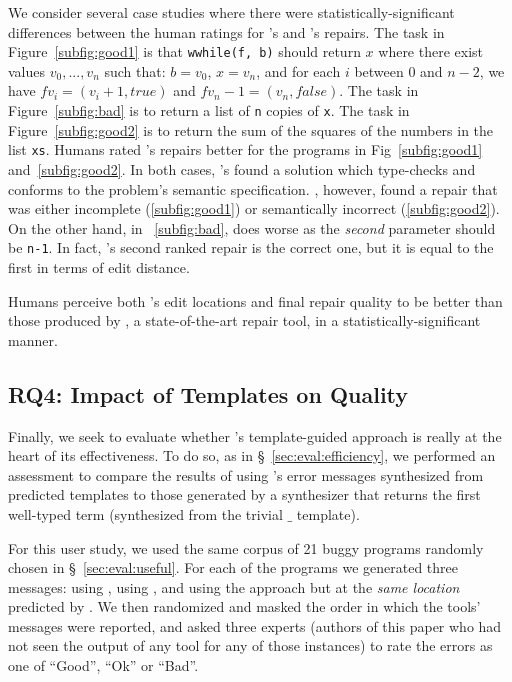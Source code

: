 %
We consider several case studies where there were
statistically-significant differences between
the human ratings for \toolname's and \seminal's
repairs.
%
The task in Figure~\ref{subfig:good1} is that
\texttt{wwhile(f, b)} should return $x$ where
there exist values $v_0,...,v_n$ such that:
$b = v_0$, $x = v_n$, and for each $i$ between
0 and $n-2$, we have $f v_i = (v_i+1, true)$
and $f v_n-1 = (v_n, false)$.
%
The task in Figure~\ref{subfig:bad} is to
return a list of \texttt{n} copies of \texttt{x}.
%
The task in Figure~\ref{subfig:good2} is to
return the sum of the squares of the numbers
in the list \texttt{xs}.
%
Humans rated \toolname's repairs better
for the programs in Fig~\ref{subfig:good1}
and~\ref{subfig:good2}.
%
In both cases, \toolname's found a solution
which type-checks and conforms to the problem's
semantic specification.
%
\seminal, however, found a repair that was
either incomplete (\ref{subfig:good1}) or
semantically incorrect (\ref{subfig:good2}).
On the other hand, in ~\ref{subfig:bad}, \toolname
does worse as the \emph{second} parameter should
be \verb|n-1|. In fact, \toolname's second ranked
repair is the correct one, but it is equal
to the first in terms of edit distance.

\begin{framed}
\noindent Humans perceive both \toolname's edit locations
 and final repair quality to be better than those produced
 by \seminal, a state-of-the-art \ocaml repair tool, in a
 statistically-significant manner.
\end{framed}

\subsection{RQ4: Impact of Templates on Quality}
\label{sec:eval:template_quality}

Finally, we seek to evaluate whether \toolname's template-guided
approach is really at the heart of its effectiveness. To do so,
as in \S~\ref{sec:eval:efficiency}, we performed an assessment
to compare the results of using \toolname's error messages
synthesized from predicted templates to those generated by
a \naive synthesizer that returns the first well-typed term
(\ie synthesized from the trivial $\_$ template).

%
For this user study, we used the same corpus of 21 buggy programs
randomly chosen in \S~\ref{sec:eval:useful}. For each of the
programs we generated three messages: using \toolname, using \seminal,
and using the \naive approach but at the \emph{same location} predicted
by \toolname. We then randomized and masked the order in which the tools'
messages were reported, and asked three experts (authors of this paper who
had not seen the output of any tool for any of those instances)
to rate the errors as one of ``Good'', ``Ok'' or ``Bad''.


